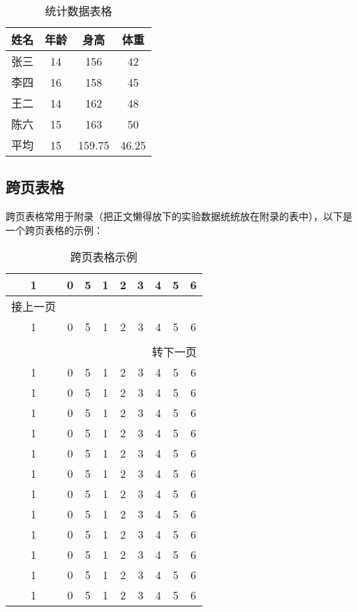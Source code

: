 \begin{table}[ht]
  \centering
  \caption{统计数据表格}
  \label{tab:6}
  \begin{tabularx}{\textwidth}{CCCC}
    \toprule
    姓名&年龄&身高&体重\\
    \midrule
    张三&14&156&42\\
    李四&16&158&45\\
    王二&14&162&48\\
    陈六&15&163&50\\
    平均&15&159.75&46.25\\
    \bottomrule
  \end{tabularx}
\end{table}

\subsection{跨页表格}
跨页表格常用于附录（把正文懒得放下的实验数据统统放在附录的表中），以下是一个跨页表格的示例：

{\centering
  \begin{longtable}{ccccccccc}
  \caption{跨页表格示例} \\
  \toprule
  1     & 0 & 5  & 1  & 2  & 3  & 4  &  5 & 6 \\
  \midrule
  \endfirsthead

  \multicolumn{1}{l}{接上一页} \\
  \toprule
  1     & 0 & 5  & 1  & 2  & 3  & 4  &  5 & 6 \\
  \midrule
  \endhead

  \bottomrule
  \hline \\
  \multicolumn{9}{r}{{转下一页}} \\
  \endfoot

  \bottomrule
  \endlastfoot    

  1     & 0 & 5  & 1  & 2  & 3  & 4  &  5 & 6 \\
  1     & 0 & 5  & 1  & 2  & 3  & 4  &  5 & 6 \\
  1     & 0 & 5  & 1  & 2  & 3  & 4  &  5 & 6 \\
  1     & 0 & 5  & 1  & 2  & 3  & 4  &  5 & 6 \\
  1     & 0 & 5  & 1  & 2  & 3  & 4  &  5 & 6 \\
  1     & 0 & 5  & 1  & 2  & 3  & 4  &  5 & 6 \\
  1     & 0 & 5  & 1  & 2  & 3  & 4  &  5 & 6 \\
  1     & 0 & 5  & 1  & 2  & 3  & 4  &  5 & 6 \\
  1     & 0 & 5  & 1  & 2  & 3  & 4  &  5 & 6 \\
  1     & 0 & 5  & 1  & 2  & 3  & 4  &  5 & 6 \\
  1     & 0 & 5  & 1  & 2  & 3  & 4  &  5 & 6 \\
  1     & 0 & 5  & 1  & 2  & 3  & 4  &  5 & 6 \\

  \end{longtable}
}

